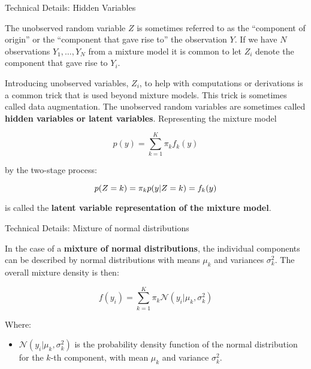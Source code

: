 \begin{frame}{Technical Details: Hidden Variables}

The unobserved random variable $Z$ is sometimes referred to as the “component of origin” or the “component that gave rise to” the observation $Y$. If we have $N$ observations $Y_1,…,Y_N$ from a mixture model it is common to let $Z_i$ denote the component that gave rise to $Y_i$.

Introducing unobserved variables, $Z_i$, to help with computations or derivations is a common trick that is used beyond mixture models. This trick is sometimes called data augmentation. The unobserved random variables are sometimes called \textbf{hidden variables or latent variables}. Representing the mixture model

$$
p(y) = \sum_{k=1}^{K} \pi_k f_k(y)
$$

by the two-stage process:

$$
p(Z=k) = \pi_k \\
p(y|Z=k) = f_k(y)
$$

is called the \textbf{latent variable representation of the mixture model}.

\end{frame}

\begin{frame}{Technical Details: Mixture of normal distributions}

In the case of a \textbf{mixture of normal distributions}, the individual components can be described by normal distributions with means $\mu_k$ and variances $\sigma_k^2$. The overall mixture density is then:

$$
f(y_i) = \sum_{k=1}^{K} \pi_k \mathcal{N}(y_i | \mu_k, \sigma_k^2)
$$

Where:
\begin{itemize}
\item $\mathcal{N}(y_i | \mu_k, \sigma_k^2)$ is the probability density function of the normal distribution for the $k$-th component, with mean $\mu_k$ and variance $\sigma_k^2$.
\end{itemize}
\end{frame}

